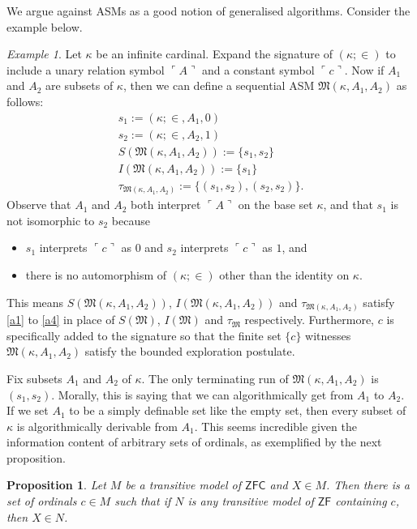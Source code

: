 \documentclass[12pt, twoside]{memoir}
\numberwithin{equation}{section}
\newtheorem{prop}[thm]{Proposition}
\theoremstyle{definition}
\theoremstyle{remark}
\newtheorem{ex}[thm]{Example}
\theoremstyle{definition}
\theoremstyle{definition}
\theoremstyle{definition}
\theoremstyle{remark}
\begin{document}
We argue against ASMs as a good notion of generalised algorithms. Consider the example below.

\begin{ex}\label{ex21}
Let $\kappa$ be an infinite cardinal. Expand the signature of $(\kappa; \in)$ to include a unary relation symbol $\ulcorner A \urcorner$ and a constant symbol $\ulcorner c \urcorner$. Now if $A_1$ and $A_2$ are subsets of $\kappa$, then we can define a sequential ASM $\mathfrak{M}(\kappa, A_1, A_2)$ as follows:
\begin{gather*}
    s_1 := (\kappa; \in, A_1, 0) \\
    s_2 := (\kappa; \in, A_2, 1) \\
    S(\mathfrak{M}(\kappa, A_1, A_2)) := \{s_1, s_2\} \\
    I(\mathfrak{M}(\kappa, A_1, A_2)) := \{s_1\} \\
    \tau_{\mathfrak{M}(\kappa, A_1, A_2)} := \{(s_1, s_2), (s_2, s_2)\} \text{.}
\end{gather*}
Observe that $A_1$ and $A_2$ both interpret $\ulcorner A \urcorner$ on the base set $\kappa$, and that $s_1$ is not isomorphic to $s_2$ because 
\begin{itemize}
    \item $s_1$ interprets $\ulcorner c \urcorner$ as $0$ and $s_2$ interprets $\ulcorner c \urcorner$ as $1$, and
    \item there is no automorphism of $(\kappa; \in)$ other than the identity on $\kappa$.
\end{itemize}
This means $S(\mathfrak{M}(\kappa, A_1, A_2))$, $I(\mathfrak{M}(\kappa, A_1, A_2))$ and $\tau_{\mathfrak{M}(\kappa, A_1, A_2)}$ satisfy \ref{a1} to \ref{a4} in place of $S(\mathfrak{M})$, $I(\mathfrak{M})$ and $\tau_{\mathfrak{M}}$ respectively. Furthermore, $c$ is specifically added to the signature so that the finite set $\{c\}$ witnesses $\mathfrak{M}(\kappa, A_1, A_2)$ satisfy the bounded exploration postulate.
\end{ex}

Fix subsets $A_1$ and $A_2$ of $\kappa$. The only terminating run of $\mathfrak{M}(\kappa, A_1, A_2)$ is $(s_1, s_2)$. Morally, this is saying that we can algorithmically get from $A_1$ to $A_2$. If we set $A_1$ to be a simply definable set like the empty set, then every subset of $\kappa$ is algorithmically derivable from $A_1$. This seems incredible given the information content of arbitrary sets of ordinals, as exemplified by the next proposition.

\begin{prop}\label{prop22}
Let $M$ be a transitive model of $\mathsf{ZFC}$ and $X \in M$. Then there is a set of ordinals $c \in M$ such that if $N$ is any transitive model of $\mathsf{ZF}$ containing $c$, then $X \in N$. 
\end{prop}
\end{document}
